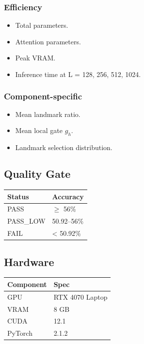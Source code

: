 \subsubsection{Efficiency}
\begin{itemize}
\item Total parameters.
\item Attention parameters.
\item Peak VRAM.
\item Inference time at L = 128, 256, 512, 1024.

\end{itemize}
\subsubsection{Component-specific}
\begin{itemize}
\item Mean landmark ratio.
\item Mean local gate $g_h$.
\item Landmark selection distribution.

\end{itemize}
\subsection{Quality Gate}

\begin{table}[H]
\centering
\small
\begin{tabular}{ll}
\toprule
\textbf{Status} & \textbf{Accuracy} \\
\midrule
PASS & $\ge$ 56\% \\
PASS\_LOW & 50.92--56\% \\
FAIL & \textless{} 50.92\% \\
\bottomrule
\end{tabular}
\end{table}

\subsection{Hardware}

\begin{table}[H]
\centering
\small
\begin{tabular}{ll}
\toprule
\textbf{Component} & \textbf{Spec} \\
\midrule
GPU & RTX 4070 Laptop \\
VRAM & 8 GB \\
CUDA & 12.1 \\
PyTorch & 2.1.2 \\
\bottomrule
\end{tabular}
\end{table}


